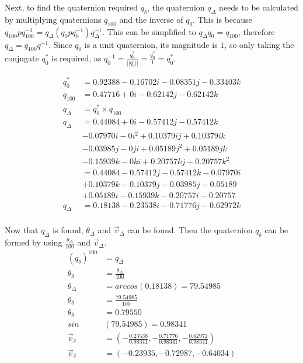 \documentclass{article}
\begin{document}
Next, to find the quaternion required $q_{\delta}$, the quaternion $q_{\Delta}$ needs to be calculated by multiplying quaternions $q_{100}$ and the inverse of $q_{0}$. This is because $q_{100}pq^{-1}_{100} = q_{\Delta}(q_{0}pq^{-1}_{0})q_{\Delta}^{-1}$. This can be simplified to $q_{\Delta}q_0 = q_{100}$, therefore $q_{\Delta} = q_{100}q^{-1}$. Since $q_{0}$ is a unit quaternion, its magnitude is $1$, so only taking the conjugate $q^*_0$ is required, as $q^{-1}_0 = \frac{q^*_0}{||q_0||} = \frac{q^*_0}{1} = q^*_0$.

\begin{align*}
q_0^* &= 0.92388 - 0.16702i - 0.08351j - 0.33403k\\[1em]
q_{100} &= 0.47716 + 0i - 0.62142j - 0.62142k\\[1em]
q_{\Delta} &= q_0^* \times q_{100}\\[1em]
q_{\Delta} &= 0.44084 + 0i - 0.57412j - 0.57412k\\
 &- 0.07970i - 0i^2 + 0.10379ij + 0.10379ik\\
 &- 0.03985j - 0ji + 0.05189j^2 + 0.05189jk\\
 &- 0.15939k - 0ki + 0.20757kj + 0.20757k^2\\[1em]
 &= 0.44084 - 0.57412j - 0.57412k - 0.07970i\\
 &+ 0.10379k - 0.10379j - 0.03985j - 0.05189\\
 &+ 0.05189i - 0.15939k - 0.20757i - 0.20757\\[1em]
q_{\Delta} &=0.18138 - 0.23538i - 0.71776j - 0.62972k\\[1em]
\end{align*}

Now that $q_{\Delta}$ is found, $\theta_{\Delta}$ and $\vec{v}_{\Delta}$ can be found. Then the quaternion $q_{\delta}$ can be formed by using $\frac{\theta_{\Delta}}{100}$ and $\vec{v}_{\Delta}$.
\begin{align*}
(q_{\delta})^{100} &= q_{\Delta}\\[1em]
\theta_{\delta} &= \frac{\theta_{\Delta}}{100}\\[1em]
\theta_{\Delta} &= arccos(0.18138) = 79.54985\\[1em]
\theta_{\delta} &= \frac{79.54985}{100}\\[1em]
\theta_{\delta} &= 0.79550\\[1em]
sin&(79.54985) = 0.98341\\[1em]
\vec{v}_{\delta} &=  (- \frac{0.23538}{0.98341}, - \frac{0.71776}{0.98341}, - \frac{0.62972}{0.98341})\\
\vec{v}_{\delta} &= (-0.23935, -0.72987, -0.64034)\\[1em]
\end{align*}
\end{document}
